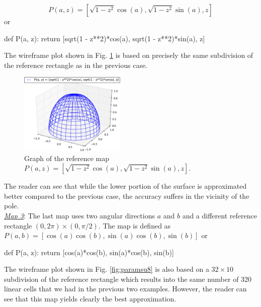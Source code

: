 $$
P(a, z) = \left[\sqrt{1 - z^2}\cos(a), \sqrt{1 - z^2}\sin(a), z\right]
$$
or

\begin{bluecode}
def P(a, z): 
    return [sqrt(1 - z**2)*cos(a), sqrt(1 - z**2)*sin(a), z]
\end{bluecode}
The wireframe plot shown in Fig. \ref{fig:paramsu3} is based on precisely the 
same subdivision of the reference rectangle as in the previous case. 
\newpage

\begin{figure}[!ht]
\begin{center}
\includegraphics[width=0.45\textwidth]{img/paramsu6.png}
\end{center}
\vspace{-6mm}
\caption{Graph of the reference map $P(a, z) = \left[\sqrt{1 - z^2}\cos(a), \sqrt{1 - z^2}\sin(a), z\right]$.}
\label{fig:paramsu3}
\end{figure}
\noindent
The reader can see that while the lower portion of the surface is approximated 
better compared to the previous case, the accuracy suffers in the vicinity of the pole.\\

\noindent
\underline{\em Map 3}: The last map uses two angular directions $a$ and $b$ and 
a different reference rectangle $(0, 2\pi)\times(0, \pi/2)$. The map is 
defined as
$
P(a, b) = \left[\cos(a)\cos(b), \sin(a)\cos(b), \sin(b)\right]
$
or

\begin{bluecode}
def P(a, z): return [cos(a)*cos(b), sin(a)*cos(b), sin(b)]
\end{bluecode}
The wireframe plot shown in Fig. \ref{fig:paramsu8} is also based on a
$32 \times 10$ subdivision of the reference rectangle which results into the 
same number of 320 linear cells that we had in the previous two examples.
However, the reader can see that this map yields clearly the best approximation. 


